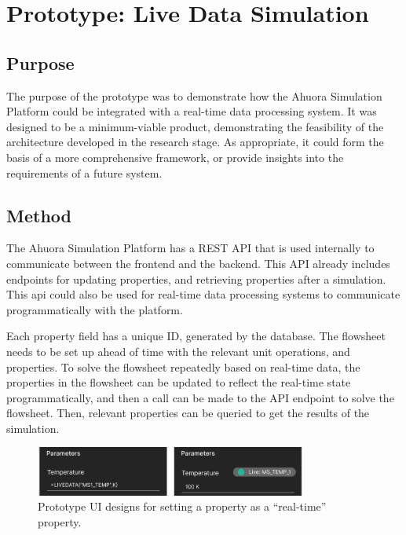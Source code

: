 \documentclass[12pt]{report}
\begin{document}

\chapter{Prototype: Live Data Simulation}

\section{Purpose}

The purpose of the prototype was to demonstrate how the Ahuora Simulation Platform could be integrated with a real-time data processing system. It was designed to be a minimum-viable product, demonstrating the feasibility of the architecture developed in the research stage. As appropriate, it could form the basis of a more comprehensive framework, or provide insights into the requirements of a future system.

\section{Method}


The Ahuora Simulation Platform has a REST API that is used internally to communicate between the frontend and the backend. This API already includes endpoints for updating properties, and retrieving properties after a simulation. This api could also be used for real-time data processing systems to communicate programmatically with the platform.


Each property field has a unique ID, generated by the database. The flowsheet needs to be set up ahead of time with the relevant unit operations, and properties. To solve the flowsheet repeatedly based on real-time data, the properties in the flowsheet can be updated to reflect the real-time state programmatically, and then a call can be made to the API endpoint to solve the flowsheet. Then, relevant properties can be queried to get the results of the simulation.

\begin{figure}
    \centering
    \includegraphics[width=0.8\textwidth]{property_ui.png}
    \caption{Prototype UI designs for setting a property as a ``real-time'' property.}
    \label{fig:property-ui}
\end{figure}
\end{document}
